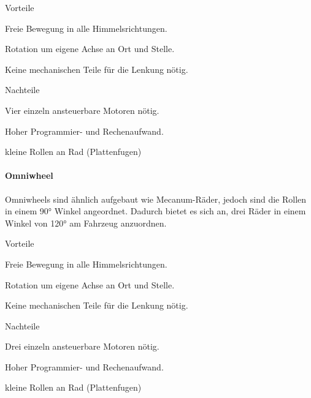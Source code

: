 \documentclass[../main.tex]{subfiles}
\begin{document}
\begin{minipage}[t]{0.48\textwidth}
    \begin{items}
      \item [Vorteile]
      \item Freie Bewegung in alle Himmelsrichtungen.
      \item Rotation um eigene Achse an Ort und Stelle.
      \item Keine mechanischen Teile für die Lenkung nötig.
 \end{items}
\end{minipage}
\hfill
\begin{minipage}[t]{0.48\textwidth}
    \begin{items}
      \item [Nachteile]
      \item Vier einzeln ansteuerbare Motoren nötig.
      \item Hoher Programmier- und Rechenaufwand.
      \item kleine Rollen an Rad (Plattenfugen)
    \end{items}
\end{minipage}

\paragraph{Omniwheel} \label{recherche-omniwheel}

Omniwheels sind ähnlich aufgebaut wie Mecanum-Räder, jedoch sind die Rollen in einem 90° Winkel angeordnet. Dadurch bietet es sich an, drei Räder in einem Winkel von 120° am Fahrzeug anzuordnen.

\begin{minipage}[t]{0.48\textwidth}
    \begin{items}
        \item[Vorteile]
        \item Freie Bewegung in alle Himmelsrichtungen.
      \item Rotation um eigene Achse an Ort und Stelle.
      \item Keine mechanischen Teile für die Lenkung nötig.
    \end{items}
\end{minipage}
\begin{minipage}[t]{0.48\textwidth}
    \begin{items}
      \item [Nachteile]
      \item Drei einzeln ansteuerbare Motoren nötig.
      \item Hoher Programmier- und Rechenaufwand.
      \item kleine Rollen an Rad (Plattenfugen)
    \end{items}
\end{minipage}
\end{document}
